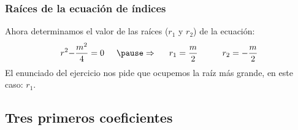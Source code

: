 \documentclass[12pt]{beamer}
\begin{document}
\begin{frame}
\frametitle{Raíces de la ecuación de índices}
Ahora determinamos el valor de las raíces ($r_{1}$ y $r_{2}$) de la ecuación:
\begin{eqnarray*}
r^{2} {-} \dfrac{m^{2}}{4} = 0 \hspace{0.5cm} \pause \Rightarrow \hspace{0.5cm} r_{1} = \dfrac{m}{2} \hspace{1cm} r_{2} = -\dfrac{m}{2}
\end{eqnarray*}
\pause
El enunciado del ejercicio nos pide que ocupemos la raíz más grande, en este caso: $r_{1}$.
\end{frame}

\subsection{Tres primeros coeficientes}
\end{document}
